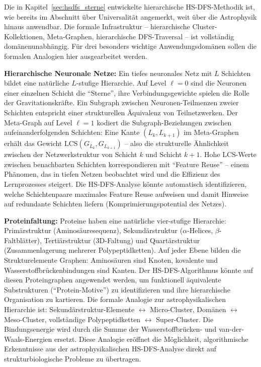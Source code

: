 ﻿\documentclass[a4paper,12pt]{report}
\theoremstyle{definition}
\begin{document}
Die in Kapitel~\ref{sec:hsdfs_sterne} entwickelte hierarchische HS-DFS-Methodik ist, wie bereits im Abschnitt über Universalität angemerkt, weit über die Astrophysik hinaus anwendbar. Die formale Infrastruktur -- hierarchische Cluster-Kollektionen, Meta-Graphen, hierarchische DFS-Traversal -- ist vollständig domänenunabhängig. Für drei besonders wichtige Anwendungsdomänen sollen die formalen Analogien hier ausgearbeitet werden.

\textbf{Hierarchische Neuronale Netze:} Ein tiefes neuronales Netz mit $L$ Schichten bildet eine natürliche $L$-stufige Hierarchie. Auf Level $\ell = 0$ sind die Neuronen einer einzelnen Schicht die ``Sterne'', ihre Verbindungsgewichte spielen die Rolle der Gravitationskräfte. Ein Subgraph zwischen Neuronen-Teilmenzen zweier Schichten entspricht einer strukturellen Äquivalenz von Teilnetzwerken. Der Meta-Graph auf Level $\ell = 1$ kodiert die Subgraph-Beziehungen zwischen aufeinanderfolgenden Schichten: Eine Kante $(L_k, L_{k+1})$ im Meta-Graphen erhält das Gewicht $\mathrm{LCS}(G_{L_k}, G_{L_{k+1}})$ -- also die strukturelle Ähnlichkeit zwischen der Netzwerkstruktur von Schicht $k$ und Schicht $k+1$. Hohe LCS-Werte zwischen benachbarten Schichten korrespondieren mit ``Feature Reuse'' -- einem Phänomen, das in tiefen Netzen beobachtet wird und die Effizienz des Lernprozesses steigert. Die HS-DFS-Analyse könnte automatisch identifizieren, welche Schichtenpaare maximales Feature Reuse aufweisen und damit Hinweise auf redundante Schichten liefern (Komprimierungspotential des Netzes).

\textbf{Proteinfaltung:} Proteine haben eine natürliche vier-stufige Hierarchie: Primärstruktur (Aminosäuresequenz), Sekundärstruktur ($\alpha$-Helices, $\beta$-Faltblätter), Tertiärstruktur (3D-Faltung) und Quartärstruktur (Zusammenlagerung mehrerer Polypeptidketten). Auf jeder Ebene bilden die Strukturelemente Graphen: Aminosäuren sind Knoten, kovalente und Wasserstoffbrückenbindungen sind Kanten. Der HS-DFS-Algorithmus könnte auf diesen Proteingraphen angewendet werden, um funktionell äquivalente Substrukturen (``Protein-Motive'') zu identifizieren und ihre hierarchische Organisation zu kartieren. Die formale Analogie zur astrophysikalischen Hierarchie ist: Sekundärstruktur-Elemente $\leftrightarrow$ Micro-Cluster, Domänen $\leftrightarrow$ Meso-Cluster, vollständige Polypeptidketten $\leftrightarrow$ Super-Cluster. Die Bindungsenergie wird durch die Summe der Wasserstoffbrücken- und van-der-Waals-Energien ersetzt. Diese Analogie eröffnet die Möglichkeit, algorithmische Erkenntnisse aus der astrophysikalischen HS-DFS-Analyse direkt auf strukturbiologische Probleme zu übertragen.
\end{document}
